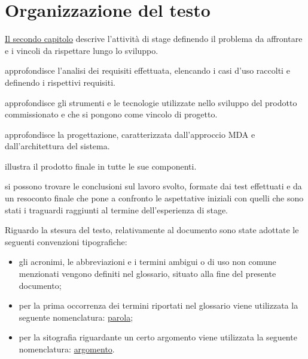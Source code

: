 \section{Organizzazione del testo}

{\hyperref[cap:descrizione-stage]{Il secondo capitolo}} descrive l'attività di stage definendo il problema da affrontare e i vincoli da rispettare lungo lo sviluppo.
    
 approfondisce l'analisi dei requisiti effettuata, elencando i casi d'uso raccolti e definendo i rispettivi requisiti.
    
 approfondisce gli strumenti e le tecnologie utilizzate nello sviluppo del prodotto commissionato e che si pongono come vincolo di progetto.
    
 approfondisce la progettazione, caratterizzata dall'approccio MDA e dall'architettura del sistema.
    
 illustra il prodotto finale in tutte le sue componenti.
    
 si possono trovare le conclusioni sul lavoro svolto, formate dai test effettuati e da un resoconto finale che pone a confronto le aspettative iniziali con quelli che sono stati i traguardi raggiunti al termine dell'esperienza di stage.

\noindent Riguardo la stesura del testo, relativamente al documento sono state adottate le seguenti convenzioni tipografiche:
\begin{itemize}
	\item gli acronimi, le abbreviazioni e i termini ambigui o di uso non comune menzionati vengono definiti nel glossario, situato alla fine del presente documento;
	\item per la prima occorrenza dei termini riportati nel glossario viene utilizzata la seguente nomenclatura: {\hyperref[cap:glossario]{parola}}\glsfirstoccur;
	\item per la sitografia riguardante un certo argomento viene utilizzata la seguente nomenclatura: {\hyperref[cap:sitografia]{argomento}}\ap{{[b]}}.
\end{itemize}
